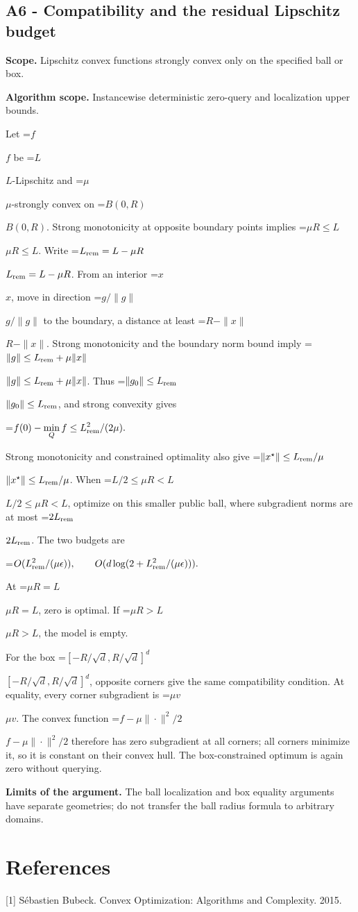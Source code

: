 \documentclass[10pt,a4paper]{article}
\newcommand{\AtlasMath}[1]{\par\begingroup\centering\setbox0=\hbox{$\displaystyle #1$}\ifdim\wd0>1.4\linewidth\typeout{ATLAS WIDE FORMULA: \the\wd0}\fi\ifdim\wd0>\linewidth\resizebox{\linewidth}{!}{\box0}\else\box0\fi\par\endgroup}
\newcommand{\AtlasInlineMath}[1]{\begingroup\setbox0=\hbox{$#1$}\ifdim\wd0>.4\linewidth\endgroup\AtlasMath{#1}\else\endgroup$#1$\fi}
\begin{document}
\subsection{A6 - Compatibility and the residual Lipschitz budget}
\textbf{Scope.} Lipschitz convex functions strongly convex only on the specified ball or box.

\textbf{Algorithm scope.} Instancewise deterministic zero-query and localization upper bounds.

Let \AtlasInlineMath{f} be \AtlasInlineMath{L}-Lipschitz and \AtlasInlineMath{\mu}-strongly convex on \AtlasInlineMath{B(0,R)}. Strong monotonicity at opposite boundary points implies \AtlasInlineMath{\mu R\le L}. Write \AtlasInlineMath{L_{\rm rem}=L-\mu R}. From an interior \AtlasInlineMath{x}, move in direction \AtlasInlineMath{g/\|g\|} to the boundary, a distance at least \AtlasInlineMath{R-\|x\|}. Strong monotonicity and the boundary norm bound imply
\AtlasInlineMath{\|g\|\le L_{\rm rem}+\mu\|x\|}.
Thus \AtlasInlineMath{\|g_0\|\le L_{\rm rem}}, and strong convexity gives

\AtlasMath{f(0)-\min_Qf\le L_{\rm rem}^2/(2\mu).}

Strong monotonicity and constrained optimality also give \AtlasInlineMath{\|x^\star\|\le L_{\rm rem}/\mu}. When \AtlasInlineMath{L/2\le\mu R<L}, optimize on this smaller public ball, where subgradient norms are at most \AtlasInlineMath{2L_{\rm rem}}. The two budgets are

\AtlasMath{O(L_{\rm rem}^2/(\mu\epsilon)),\qquad
O(d\log(2+L_{\rm rem}^2/(\mu\epsilon))).}

At \AtlasInlineMath{\mu R=L}, zero is optimal. If \AtlasInlineMath{\mu R>L}, the model is empty.

For the box \AtlasInlineMath{[-R/\sqrt d,R/\sqrt d]^d}, opposite corners give the same compatibility condition. At equality, every corner subgradient is \AtlasInlineMath{\mu v}. The convex function \AtlasInlineMath{f-\mu\|\cdot\|^2/2} therefore has zero subgradient at all corners; all corners minimize it, so it is constant on their convex hull. The box-constrained optimum is again zero without querying.

\textbf{Limits of the argument.} The ball localization and box equality arguments have separate geometries; do not transfer the ball radius formula to arbitrary domains.

\section{References}
[1] Sébastien Bubeck. Convex Optimization: Algorithms and Complexity. 2015.
\end{document}
